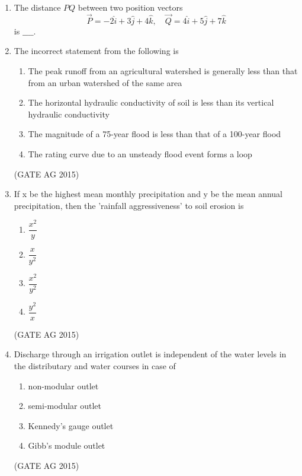 \documentclass[journal,12pt,onecolumn]{IEEEtran}
\theoremstyle{remark}
\begin{document}
\begin{enumerate}
\item The distance $PQ$ between two position vectors 
\[
\vec{P} = -2\hat{i} + 3\hat{j} + 4\hat{k}, 
\quad \vec{Q} = 4\hat{i} + 5\hat{j} + 7\hat{k}
\]
is $\_\_\_\_$.

\item The incorrect statement from the following is

\begin{enumerate}
    \item  The peak runoff from an agricultural watershed is generally less than that from an urban watershed of the same area
    \item  The horizontal hydraulic conductivity of soil is less than its vertical hydraulic conductivity
    \item  The magnitude of a 75-year flood is less than that of a 100-year flood
    \item  The rating curve due to an unsteady flood event forms a loop
\end{enumerate}
\hfill{(GATE AG 2015)}


\item If x be the highest mean monthly precipitation and y be the mean annual precipitation, then the 'rainfall aggressiveness' to soil erosion is
\begin{multicols}{4}
\begin{enumerate}
    \item  $\dfrac{x^2}{y}$
    \item  $\dfrac{x}{y^2}$
    \item  $\dfrac{x^2}{y^2}$
    \item  $\dfrac{y^2}{x}$
\end{enumerate}
\end{multicols}
\hfill{(GATE AG 2015)}

\item Discharge through an irrigation outlet is independent of the water levels in the distributary and water courses in case of 
\begin{multicols}{4}
\begin{enumerate}
    \item non-modular outlet
    \item semi-modular outlet
    \item Kennedy's gauge outlet
    \item Gibb's module outlet
\end{enumerate}
\end{multicols}
\hfill{(GATE AG 2015)}


\end{enumerate}
\end{document}
